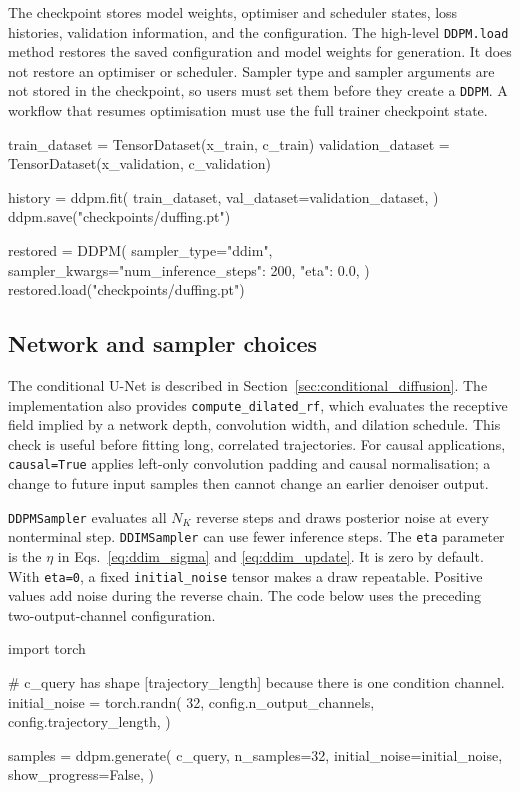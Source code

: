 The checkpoint stores model weights, optimiser and scheduler states, loss
histories, validation information, and the configuration. The high-level
\texttt{DDPM.load} method restores the saved configuration and model weights for
generation. It does not restore an optimiser or scheduler. Sampler type and
sampler arguments are not stored in the checkpoint, so users must set them before
they create a \texttt{DDPM}. A workflow that resumes optimisation must use the
full trainer checkpoint state.

\begin{pythonlisting}
train_dataset = TensorDataset(x_train, c_train)
validation_dataset = TensorDataset(x_validation, c_validation)

history = ddpm.fit(
    train_dataset,
    val_dataset=validation_dataset,
)
ddpm.save("checkpoints/duffing.pt")

restored = DDPM(
    sampler_type="ddim",
    sampler_kwargs={"num_inference_steps": 200, "eta": 0.0},
)
restored.load("checkpoints/duffing.pt")
\end{pythonlisting}

\subsection{Network and sampler choices}

The conditional U-Net is described in Section~\ref{sec:conditional_diffusion}.
The implementation also provides \texttt{compute\_dilated\_rf}, which evaluates
the receptive field implied by a network depth, convolution width, and dilation
schedule. This check is useful before fitting long, correlated trajectories. For
causal applications, \texttt{causal=True} applies left-only convolution padding
and causal normalisation; a change to future input samples then cannot change an
earlier denoiser output.

\texttt{DDPMSampler} evaluates all $N_K$ reverse steps and draws posterior noise
at every nonterminal step. \texttt{DDIMSampler} can use fewer inference steps.
The \texttt{eta} parameter is the $\eta$ in Eqs.~\eqref{eq:ddim_sigma} and
\eqref{eq:ddim_update}. It is zero by default. With \texttt{eta=0}, a fixed
\texttt{initial\_noise} tensor makes a draw repeatable. Positive values add noise
during the reverse chain. The code below uses the preceding two-output-channel
configuration.

\begin{pythonlisting}
import torch

# c_query has shape [trajectory_length] because there is one condition channel.
initial_noise = torch.randn(
    32, config.n_output_channels, config.trajectory_length,
)

samples = ddpm.generate(
    c_query,
    n_samples=32,
    initial_noise=initial_noise,
    show_progress=False,
)
\end{pythonlisting}

